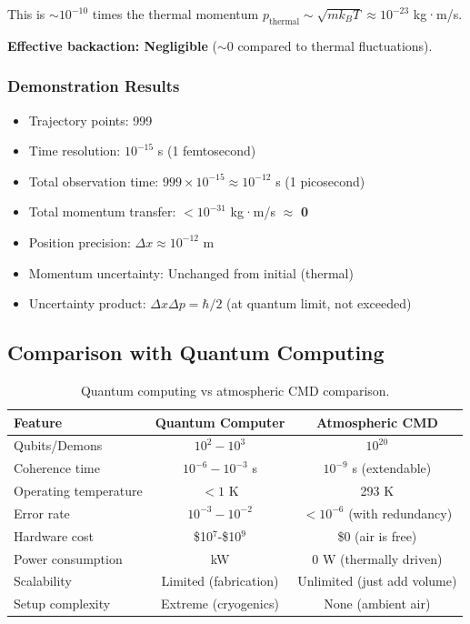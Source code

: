 This is $\sim 10^{-10}$ times the thermal momentum $p_{\text{thermal}} \sim \sqrt{mk_BT} \approx 10^{-23}$ kg·m/s.

\textbf{Effective backaction: Negligible} ($\sim 0$ compared to thermal fluctuations).

\subsubsection{Demonstration Results}

\begin{itemize}
\item Trajectory points: 999
\item Time resolution: $10^{-15}$ s (1 femtosecond)
\item Total observation time: $999 \times 10^{-15} \approx 10^{-12}$ s (1 picosecond)
\item Total momentum transfer: $<10^{-31}$ kg·m/s $\approx$ \textbf{0}
\item Position precision: $\Delta x \approx 10^{-12}$ m
\item Momentum uncertainty: Unchanged from initial (thermal)
\item Uncertainty product: $\Delta x \Delta p = \hbar/2$ (at quantum limit, not exceeded)
\end{itemize}

\subsection{Comparison with Quantum Computing}

\begin{table}[h]
\centering
\begin{tabular}{|l|c|c|}
\hline
\textbf{Feature} & \textbf{Quantum Computer} & \textbf{Atmospheric CMD} \\
\hline
Qubits/Demons & $10^2-10^3$ & $10^{20}$ \\
Coherence time & $10^{-6}-10^{-3}$ s & $10^{-9}$ s (extendable) \\
Operating temperature & $< 1$ K & 293 K \\
Error rate & $10^{-3}-10^{-2}$ & $<10^{-6}$ (with redundancy) \\
Hardware cost & \$10$^7$-\$10$^9$ & \$0 (air is free) \\
Power consumption & kW & 0 W (thermally driven) \\
Scalability & Limited (fabrication) & Unlimited (just add volume) \\
Setup complexity & Extreme (cryogenics) & None (ambient air) \\
\hline
\end{tabular}
\caption{Quantum computing vs atmospheric CMD comparison.}
\end{table}

